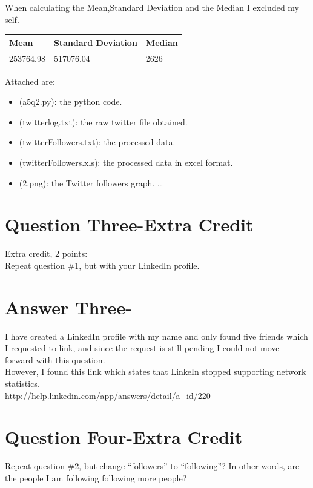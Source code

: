 \documentclass[letterpaper,11pt]{article}
\begin{document}
When calculating the Mean,Standard Deviation and the Median I excluded my self.

\begin{table}[H]
    \begin{tabular}{|| l || l || l ||}\hline
    Mean & Standard Deviation & Median \\\hline
    253764.98  & 517076.04 & 2626 \\\hline
    \end{tabular}
\end{table}

Attached are:
\begin{itemize}
\item (a5q2.py): the python code.
\item (twitterlog.txt): the raw twitter file obtained.
\item (twitterFollowers.txt): the processed data.
\item (twitterFollowers.xls): the processed data in excel format.
\item (2.png): the Twitter followers graph.
\ldots
\end{itemize}

\pagebreak
\section*{Question Three-Extra Credit}

Extra credit, 2 points:\\
Repeat question \#1, but with your LinkedIn profile.


\pagebreak
\section*{Answer Three-}
I have created a LinkedIn profile with my name and only found five friends which I requested to link, and since the request is still pending I could not move forward with this question.\\

However, I found this link which states that LinkeIn stopped supporting network statistics.\\
\url{http://help.linkedin.com/app/answers/detail/a_id/220}

\pagebreak
\section*{Question Four-Extra Credit}
Repeat question \#2, but change ``followers'' to ``following''? In other words, are the people I am following following more people?
\end{document}
